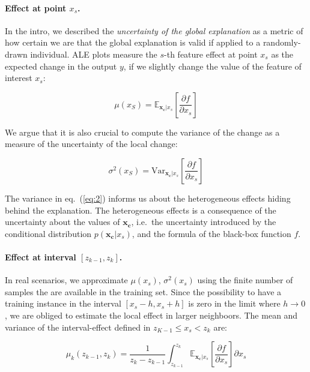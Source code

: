\documentclass{article}
\begin{document}
\paragraph{Effect at point \(x_s\).} In the intro, we described the
\textit{uncertainty of the global explanation} as a metric of how
certain we are that the global explanation is valid if applied to a
randomly-drawn individual. ALE plots measure the \(s\)-th feature
effect at point \(x_s\) as the expected change in the output \(y\), if
we slightly change the value of the feature of interest \(x_s\):

\begin{equation}
  \label{eq:ALE_expectation}
  \mu(x_S) = \mathbb{E}_{\mathbf{x_c}|x_s}\left [\frac{\partial
      f}{\partial x_s} \right ]
\end{equation}

\noindent
We argue that it is also crucial to compute the variance of the change
as a measure of the uncertainty of the local change:

\begin{equation}
  \label{eq:2}
  \sigma^2(x_S) = \mathrm{Var}_{\mathbf{x_c}|x_s}\left [\frac{\partial
      f}{\partial x_s} \right ]
\end{equation}

\noindent
The variance in eq.~(\ref{eq:2}) informs us about the heterogeneous
effects hiding behind the explanation. The heterogeneous effects is a
consequence of the uncertainty about the values of \(\mathbf{x_c}\),
i.e.~the uncertainty introduced by the conditional distribution
\(p(\mathbf{x_c}|x_s)\), and the formula of the black-box function
\(f\).

\paragraph{Effect at interval \([z_{k-1}, z_k]\).} In real scenarios,
we approximate \(\mu(x_s)\), \(\sigma^2(x_s)\) using the finite number
of samples the are available in the training set. Since the
possibility to have a training instance in the interval
\([x_s - h, x_s + h]\) is zero in the limit where \(h \to 0\), we are
obliged to estimate the local effect in larger neighboors. The mean
and variance of the interval-effect defined in
\(z_{K-1} \leq x_s < z_k\) are:

\begin{equation}
  \label{eq:ALE_expectation_bin}
  \mu_k(z_{k-1}, z_k) = \frac{1}{z_k - z_{k-1}}  \int_{z_{k-1}}^{z_k} \mathbb{E}_{\mathbf{x_c}|x_s}\left [\frac{\partial
      f}{\partial x_s} \right ] \partial x_s
\end{equation}
\end{document}
